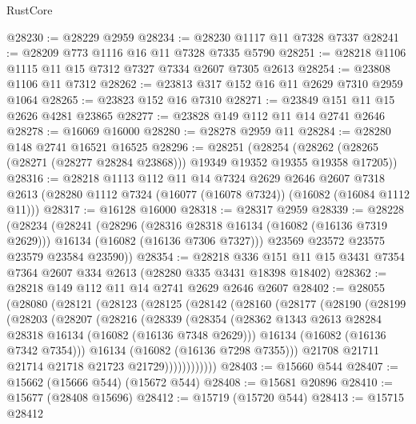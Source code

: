 \begin{lexlean}{RustCore}
\begin{coremodule}
@28230 := @28229 @2959
@28234 := @28230 @1117 @11 @7328 @7337
@28241 := @28209 @773 @1116 @16 @11 @7328 @7335 @5790
@28251 := @28218 @1106 @1115 @11 @15 @7312 @7327 @7334 @2607 @7305 @2613
@28254 := @23808 @1106 @11 @7312
@28262 := @23813 @317 @152 @16 @11 @2629 @7310 @2959 @1064
@28265 := @23823 @152 @16 @7310
@28271 := @23849 @151 @11 @15 @2626 @4281 @23865
@28277 := @23828 @149 @112 @11 @14 @2741 @2646
@28278 := @16069 @16000
@28280 := @28278 @2959 @11
@28284 := @28280 @148 @2741 @16521 @16525
@28296 := @28251
    (@28254 (@28262 (@28265 (@28271 (@28277 @28284 @23868))) @19349 @19352 @19355 @19358 @17205))
@28316 := @28218
    @1113
    @112
    @11
    @14
    @7324
    @2629
    @2646
    @2607
    @7318
    @2613
    (@28280 @1112 @7324 (@16077 (@16078 @7324)) (@16082 (@16084 @1112 @11)))
@28317 := @16128 @16000
@28318 := @28317 @2959
@28339 := @28228
    (@28234
      (@28241
        (@28296
          (@28316 @28318 @16134 (@16082 (@16136 @7319 @2629)))
          @16134
          (@16082 (@16136 @7306 @7327)))
        @23569
        @23572
        @23575
        @23579
        @23584
        @23590))
@28354 := @28218
    @336
    @151
    @11
    @15
    @3431
    @7354
    @7364
    @2607
    @334
    @2613
    (@28280 @335 @3431 @18398 @18402)
@28362 := @28218 @149 @112 @11 @14 @2741 @2629 @2646 @2607
@28402 := @28055
    (@28080
      (@28121
        (@28123
          (@28125
            (@28142
              (@28160
                (@28177
                  (@28190
                    (@28199
                      (@28203
                        (@28207
                          (@28216
                            (@28339
                              (@28354
                                (@28362
                                  @1343
                                  @2613
                                  @28284
                                  @28318
                                  @16134
                                  (@16082 (@16136 @7348 @2629)))
                                @16134
                                (@16082 (@16136 @7342 @7354)))
                              @16134
                              (@16082 (@16136 @7298 @7355)))
                            @21708
                            @21711
                            @21714
                            @21718
                            @21723
                            @21729))))))))))))
@28403 := @15660 @544
@28407 := @15662 (@15666 @544) (@15672 @544)
@28408 := @15681 @20896
@28410 := @15677 (@28408 @15696)
@28412 := @15719 (@15720 @544)
@28413 := @15715 @28412

\end{coremodule}
\end{lexlean}
